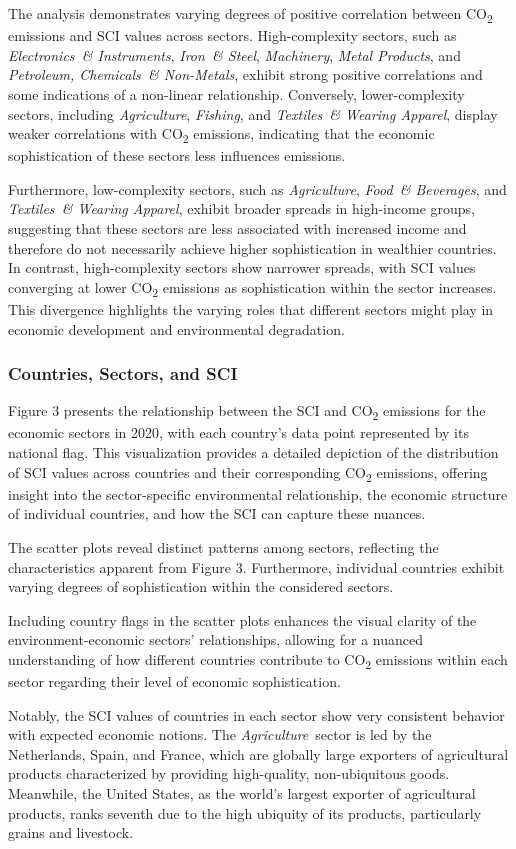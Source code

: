 \documentclass[10pt]{article}
\newcommand{\AG}{\textit{Agriculture}}
\newcommand{\EL}{\textit{Electronics~\& Instruments}}
\newcommand{\FI}{\textit{Fishing}}
\newcommand{\FO}{\textit{Food~\& Beverages}}
\newcommand{\IR}{\textit{Iron~\& Steel}}
\newcommand{\MA}{\textit{Machinery}}
\newcommand{\ME}{\textit{Metal Products}}
\newcommand{\PE}{\textit{Petroleum, Chemicals~\& Non-Metals}}
\newcommand{\TE}{\textit{Textiles~\& Wearing Apparel}}
\begin{document}
The analysis demonstrates varying degrees of positive correlation between CO\textsubscript{2} emissions and SCI values across sectors. High-complexity sectors, such as \EL, \IR, \MA, \ME, and \PE, exhibit strong positive correlations and some indications of a non-linear relationship. Conversely, lower-complexity sectors, including \AG, \FI, and \TE, display weaker correlations with CO\textsubscript{2} emissions, indicating that the economic sophistication of these sectors less influences emissions.

Furthermore, low-complexity sectors, such as \AG, \FO, and \TE, exhibit broader spreads in high-income groups, suggesting that these sectors are less associated with increased income and therefore do not necessarily achieve higher sophistication in wealthier countries. In contrast, high-complexity sectors show narrower spreads, with SCI values converging at lower CO\textsubscript{2} emissions as sophistication within the sector increases. This divergence highlights the varying roles that different sectors might play in economic development and environmental degradation.

\subsubsection{Countries, Sectors, and SCI}
\label{sec:countries-sci}
Figure 3 presents the relationship between the SCI and CO\textsubscript{2} emissions for the economic sectors in 2020, with each country's data point represented by its national flag. This visualization provides a detailed depiction of the distribution of SCI values across countries and their corresponding CO\textsubscript{2} emissions, offering insight into the sector-specific environmental relationship, the economic structure of individual countries, and how the SCI can capture these nuances.

The scatter plots reveal distinct patterns among sectors, reflecting the characteristics apparent from Figure 3. Furthermore, individual countries exhibit varying degrees of sophistication within the considered sectors. 

Including country flags in the scatter plots enhances the visual clarity of the environment-economic sectors' relationships, allowing for a nuanced understanding of how different countries contribute to CO\textsubscript{2} emissions within each sector regarding their level of economic sophistication. 

Notably, the SCI values of countries in each sector show very consistent behavior with expected economic notions. The \AG\ sector is led by the Netherlands, Spain, and France, which are globally large exporters of agricultural products characterized by providing high-quality, non-ubiquitous goods. Meanwhile, the United States, as the world's largest exporter of agricultural products, ranks seventh due to the high ubiquity of its products, particularly grains and livestock. 
\end{document}
